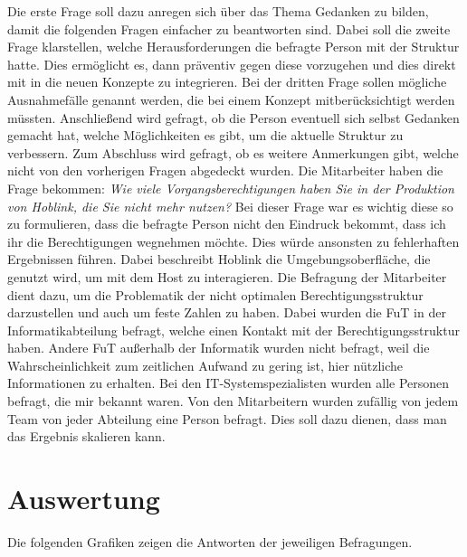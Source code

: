 Die erste Frage soll dazu anregen sich über das Thema Gedanken zu bilden, damit die folgenden Fragen einfacher zu beantworten sind.
Dabei soll die zweite Frage klarstellen, welche Herausforderungen die befragte Person mit der Struktur hatte.
Dies ermöglicht es, dann präventiv gegen diese vorzugehen und dies direkt mit in die neuen Konzepte zu integrieren.
Bei der dritten Frage sollen mögliche Ausnahmefälle genannt werden, die bei einem Konzept mitberücksichtigt werden müssten.
Anschließend wird gefragt, ob die Person eventuell sich selbst Gedanken gemacht hat, welche Möglichkeiten es gibt, um die aktuelle Struktur zu verbessern.
Zum Abschluss wird gefragt, ob es weitere Anmerkungen gibt, welche nicht von den vorherigen Fragen abgedeckt wurden.
\newline
\newline
Die Mitarbeiter haben die Frage bekommen:
\newline
\newline
\textit{Wie viele Vorgangsberechtigungen haben Sie in der Produktion von Hoblink, die Sie nicht mehr nutzen?}
\newline
\newline
Bei dieser Frage war es wichtig diese so zu formulieren, dass die befragte Person nicht den Eindruck bekommt, dass ich ihr die Berechtigungen wegnehmen möchte.
Dies würde ansonsten zu fehlerhaften Ergebnissen führen.
Dabei beschreibt Hoblink die Umgebungsoberfläche, die genutzt wird, um mit dem Host zu interagieren.
Die Befragung der Mitarbeiter dient dazu, um die Problematik der nicht optimalen Berechtigungsstruktur darzustellen und auch um feste Zahlen zu haben.
\newline
\newline
Dabei wurden die \ac{FuT} in der Informatikabteilung befragt, welche einen Kontakt mit der Berechtigungsstruktur haben.
Andere \ac{FuT} außerhalb der Informatik wurden nicht befragt, weil die Wahrscheinlichkeit zum zeitlichen Aufwand zu gering ist, hier nützliche Informationen zu erhalten.
Bei den IT-Systemspezialisten wurden alle Personen befragt, die mir bekannt waren.
Von den Mitarbeitern wurden zufällig von jedem Team von jeder Abteilung eine Person befragt.
Dies soll dazu dienen, dass man das Ergebnis skalieren kann.
\newpage
\section{Auswertung}
\label{sec:Auswertung}

Die folgenden Grafiken zeigen die Antworten der jeweiligen Befragungen.

